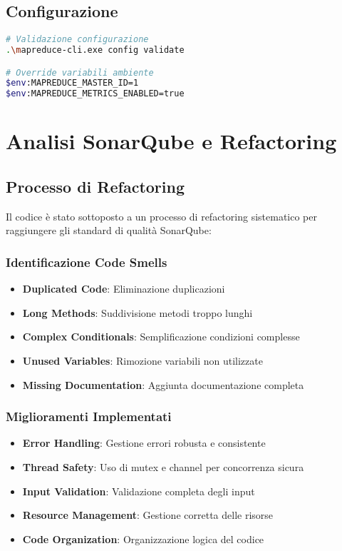 \documentclass[12pt,a4paper]{article}
\begin{document}
\subsection{Configurazione}

\begin{lstlisting}[language=bash]
# Validazione configurazione
.\mapreduce-cli.exe config validate

# Override variabili ambiente
$env:MAPREDUCE_MASTER_ID=1
$env:MAPREDUCE_METRICS_ENABLED=true
\end{lstlisting}

\section{Analisi SonarQube e Refactoring}

\subsection{Processo di Refactoring}

Il codice è stato sottoposto a un processo di refactoring sistematico per raggiungere gli standard di qualità SonarQube:

\subsubsection{Identificazione Code Smells}

\begin{itemize}
\item \textbf{Duplicated Code}: Eliminazione duplicazioni
\item \textbf{Long Methods}: Suddivisione metodi troppo lunghi
\item \textbf{Complex Conditionals}: Semplificazione condizioni complesse
\item \textbf{Unused Variables}: Rimozione variabili non utilizzate
\item \textbf{Missing Documentation}: Aggiunta documentazione completa
\end{itemize}

\subsubsection{Miglioramenti Implementati}

\begin{itemize}
\item \textbf{Error Handling}: Gestione errori robusta e consistente
\item \textbf{Thread Safety}: Uso di mutex e channel per concorrenza sicura
\item \textbf{Input Validation}: Validazione completa degli input
\item \textbf{Resource Management}: Gestione corretta delle risorse
\item \textbf{Code Organization}: Organizzazione logica del codice
\end{itemize}
\end{document}
